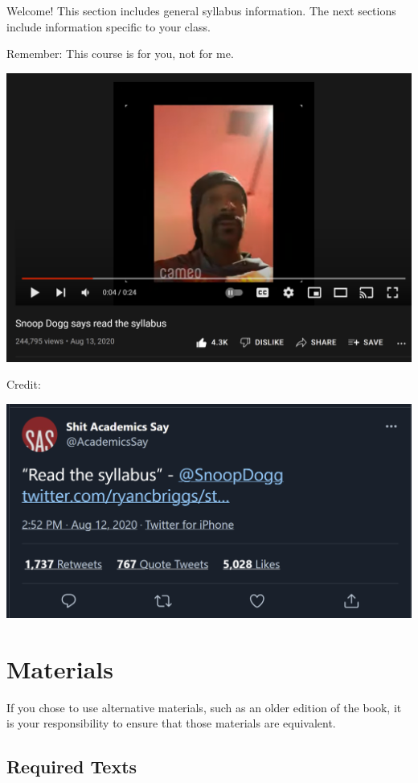 \documentclass[
]{book}
\begin{document}
Welcome! This section includes general syllabus information. The next sections include information specific to your class.

Remember: This course is for you, not for me.

\includegraphics[width=29.86in]{img/snoop}

Credit:

\includegraphics[width=19.31in]{img/AcademicsSaystatus}

\hypertarget{materials}{%
\section{Materials}\label{materials}}

If you chose to use alternative materials, such as an older edition of the book, it is your responsibility to ensure that those materials are equivalent.

\hypertarget{required-texts}{%
\subsection{Required Texts}\label{required-texts}}
\end{document}
